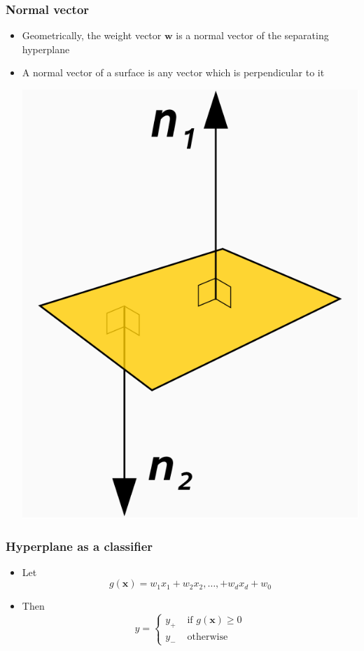 \documentclass[14pt,mathserif]{beamer}
\newcommand{\x}{\mathbf{x}}
\newcommand{\w}{\mathbf{w}}
\begin{document}
\begin{frame}
 \frametitle{Normal vector}
\begin{itemize}
\item Geometrically, the weight vector $\w$ is a \alert{normal vector}
  of the separating hyperplane
\item A normal vector of a surface is any vector which is
  perpendicular to it
\begin{center}
 \includegraphics[scale=0.2]{Normal_vectors2.png}
 \end{center}
\end{itemize}
\end{frame}


 \begin{frame}\frametitle{Hyperplane as a classifier}
   \begin{itemize}
   \item Let \[
     g(\x) =  w_1x_1 + w_2x_2, \ldots, + w_dx_d + w_0
     \]
 \item Then
   \[ y = 
   \begin{cases}
     y_{+} & \text{ if } g(\x) \geq 0\\
     y_{-} & \text{ otherwise }
   \end{cases}
 \]
   \end{itemize}
 \end{frame}
\end{document}
